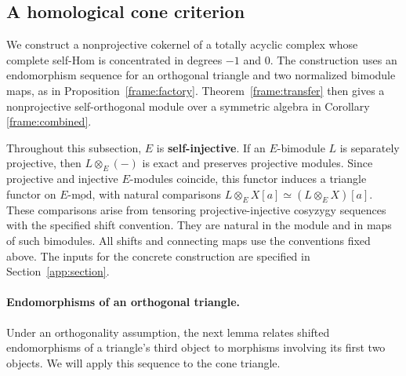 \documentclass[11pt]{article}
\begin{document}
\subsection{A homological cone criterion}
\label{frame:cone-section}

We construct a nonprojective cokernel of a totally acyclic complex
whose complete self-Hom is concentrated in degrees $-1$ and $0$.
The construction uses an endomorphism sequence for an orthogonal
triangle and two normalized bimodule maps, as in
Proposition~\ref{frame:factory}. Theorem~\ref{frame:transfer} then
gives a nonprojective self-orthogonal module over a symmetric algebra
in Corollary \ref{frame:combined}.

Throughout this subsection, $E$ is {\bf self-injective}. If an
$E$-bimodule $L$ is separately projective, then
$L\otimes_E(-)$ is exact and preserves projective modules.
Since projective and injective $E$-modules coincide, this functor
induces a triangle functor on $E\text{-}\underline{\mathrm{mod}}$,
with natural comparisons
$L\otimes_E X[a]\simeq(L\otimes_E X)[a]$.
These comparisons arise from tensoring projective-injective
cosyzygy sequences with the specified shift convention. They are
natural in the module and in maps of such bimodules.
All shifts and connecting maps use the conventions fixed above.
The inputs for the concrete construction are specified in
Section~\ref{app:section}.

\paragraph{Endomorphisms of an orthogonal triangle.}

Under an orthogonality assumption, the next lemma relates shifted
endomorphisms of a triangle's third object to morphisms involving its
first two objects. We will apply this sequence to the cone triangle.
\end{document}
